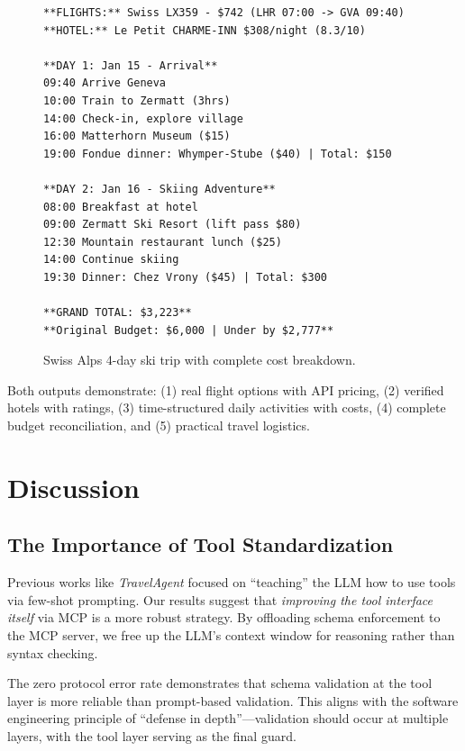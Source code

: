 \documentclass[conference]{IEEEtran}
\begin{document}
\begin{figure}[!htbp]
\scriptsize
\begin{verbatim}
**FLIGHTS:** Swiss LX359 - $742 (LHR 07:00 -> GVA 09:40)
**HOTEL:** Le Petit CHARME-INN $308/night (8.3/10)

**DAY 1: Jan 15 - Arrival**
09:40 Arrive Geneva
10:00 Train to Zermatt (3hrs)
14:00 Check-in, explore village
16:00 Matterhorn Museum ($15)
19:00 Fondue dinner: Whymper-Stube ($40) | Total: $150

**DAY 2: Jan 16 - Skiing Adventure**
08:00 Breakfast at hotel
09:00 Zermatt Ski Resort (lift pass $80)
12:30 Mountain restaurant lunch ($25)
14:00 Continue skiing
19:30 Dinner: Chez Vrony ($45) | Total: $300

**GRAND TOTAL: $3,223**
**Original Budget: $6,000 | Under by $2,777**
\end{verbatim}
\caption{Swiss Alps 4-day ski trip with complete cost breakdown.}
\label{fig:zermatt_output}
\end{figure}

Both outputs demonstrate: (1) real flight options with API pricing, (2) verified hotels with ratings, (3) time-structured daily activities with costs, (4) complete budget reconciliation, and (5) practical travel logistics.

\section{Discussion}

\subsection{The Importance of Tool Standardization}
Previous works like \textit{TravelAgent} focused on ``teaching'' the LLM how to use tools via few-shot prompting. Our results suggest that \textit{improving the tool interface itself} via MCP is a more robust strategy. By offloading schema enforcement to the MCP server, we free up the LLM's context window for reasoning rather than syntax checking.

The zero protocol error rate demonstrates that schema validation at the tool layer is more reliable than prompt-based validation. This aligns with the software engineering principle of ``defense in depth''---validation should occur at multiple layers, with the tool layer serving as the final guard.
\end{document}
